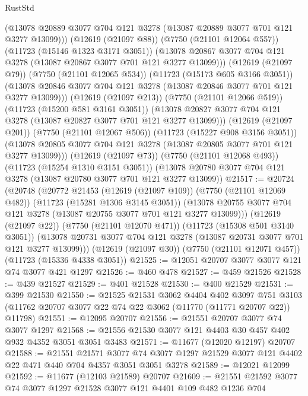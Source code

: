 \begin{lexlean}{RustStd}
\begin{coremodule}
              (@13078 @20889 @3077 @704 @121 @3278 (@13087 @20889 @3077 @701 @121 @3277 @13099)))
            (@12619 (@21097 @88))
            (@7750 (@21101 @12064 @557))
            (@11723 (@15146 @1323 @3171 @3051))
            (@13078 @20867 @3077 @704 @121 @3278 (@13087 @20867 @3077 @701 @121 @3277 @13099)))
          (@12619 (@21097 @79))
          (@7750 (@21101 @12065 @534))
          (@11723 (@15173 @605 @3166 @3051))
          (@13078 @20846 @3077 @704 @121 @3278 (@13087 @20846 @3077 @701 @121 @3277 @13099)))
        (@12619 (@21097 @213))
        (@7750 (@21101 @12066 @519))
        (@11723 (@15200 @581 @3161 @3051))
        (@13078 @20827 @3077 @704 @121 @3278 (@13087 @20827 @3077 @701 @121 @3277 @13099)))
      (@12619 (@21097 @201))
      (@7750 (@21101 @12067 @506))
      (@11723 (@15227 @908 @3156 @3051))
      (@13078 @20805 @3077 @704 @121 @3278 (@13087 @20805 @3077 @701 @121 @3277 @13099)))
    (@12619 (@21097 @73))
    (@7750 (@21101 @12068 @493))
    (@11723 (@15254 @1310 @3151 @3051))
    (@13078 @20780 @3077 @704 @121 @3278 (@13087 @20780 @3077 @701 @121 @3277 @13099))
@21517 := @20724
    (@20748
      (@20772
        @21453
        (@12619 (@21097 @109))
        (@7750 (@21101 @12069 @482))
        (@11723 (@15281 @1306 @3145 @3051))
        (@13078 @20755 @3077 @704 @121 @3278 (@13087 @20755 @3077 @701 @121 @3277 @13099)))
      (@12619 (@21097 @22))
      (@7750 (@21101 @12070 @471))
      (@11723 (@15308 @501 @3140 @3051))
      (@13078 @20731 @3077 @704 @121 @3278 (@13087 @20731 @3077 @701 @121 @3277 @13099)))
    (@12619 (@21097 @30))
    (@7750 (@21101 @12071 @457))
    (@11723 (@15336 @4338 @3051))
@21525 := @12051 @20707 @3077 @3077 @121 @74 @3077 @421 @1297
@21526 := @460 @478
@21527 := @459 @21526
@21528 := @439 @21527
@21529 := @401 @21528
@21530 := @400 @21529
@21531 := @399 @21530
@21550 := @21525
    @21531
    @3062
    @4404
    @402
    @3097
    @751
    @3103
    (@11762 @20707 @3077 @22 @74 @22 @3062 (@11770 (@11771 @20707 @22)) @11798)
@21551 := @12095 @20707
@21556 := @21551 @20707 @3077 @74 @3077 @1297
@21568 := @21556 @21530 @3077 @121 @4403 @30 @457 @402 @932 @4352 @3051 @3051 @3483
@21571 := @11677 (@12020 @12197) @20707
@21588 := @21551
    @21571
    @3077
    @74
    @3077
    @1297
    @21529
    @3077
    @121
    @4402
    @22
    @471
    @440
    @704
    @4357
    @3051
    @3051
    @3278
@21589 := @12021 @12099
@21592 := @11677 (@12103 @21589) @20707
@21609 := @21551
    @21592
    @3077
    @74
    @3077
    @1297
    @21528
    @3077
    @121
    @4401
    @109
    @482
    @1236
    @704

\end{coremodule}
\end{lexlean}
